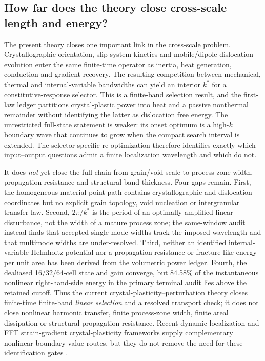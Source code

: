 \subsection{How far does the theory close cross-scale length and energy?}

The present theory closes one important link in the cross-scale problem. Crystallographic orientation, slip-system kinetics and mobile/dipole dislocation evolution enter the same finite-time operator as inertia, heat generation, conduction and gradient recovery. The resulting competition between mechanical, thermal and internal-variable bandwidths can yield an interior $k^*$ for a constitutive-response selector. This is a finite-band selection result, and the first-law ledger partitions crystal-plastic power into heat and a passive nonthermal remainder without identifying the latter as dislocation free energy. The unrestricted full-state statement is weaker: its onset optimum is a high-$k$ boundary wave that continues to grow when the compact search interval is extended. The selector-specific re-optimization therefore identifies exactly which input--output questions admit a finite localization wavelength and which do not.

It does \emph{not} yet close the full chain from grain/void scale to process-zone width, propagation resistance and structural band thickness. Four gaps remain. First, the homogeneous material-point path contains crystallographic and dislocation coordinates but no explicit grain topology, void nucleation or intergranular transfer law. Second, $2\pi/k^*$ is the period of an optimally amplified linear disturbance, not the width of a mature process zone; the same-window audit instead finds that accepted single-mode widths track the imposed wavelength and that multimode widths are under-resolved. Third, neither an identified internal-variable Helmholtz potential nor a propagation-resistance or fracture-like energy per unit area has been derived from the volumetric power ledger. Fourth, the dealiased 16/32/64-cell state and gain converge, but 84.58\% of the instantaneous nonlinear right-hand-side energy in the primary terminal audit lies above the retained cutoff. Thus the current crystal-plasticity--perturbation theory closes finite-time finite-band \emph{linear selection} and a resolved transport check; it does not close nonlinear harmonic transfer, finite process-zone width, finite areal dissipation or structural propagation resistance. Recent dynamic localization and FFT strain-gradient crystal-plasticity frameworks supply complementary nonlinear boundary-value routes, but they do not remove the need for these identification gates \cite{MouradEtAl2017,LameJouybariEtAl2024}.

